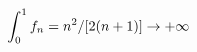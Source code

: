 \documentclass[preview]{standalone}
\begin{document}
\begin{align*}
\special{dvisvgm:raw <g id='unique000'>}\int_0^1f_n=n^2/[2(n+1)]\to+\infty\special{dvisvgm:raw </g>}
\end{align*}
\end{document}

